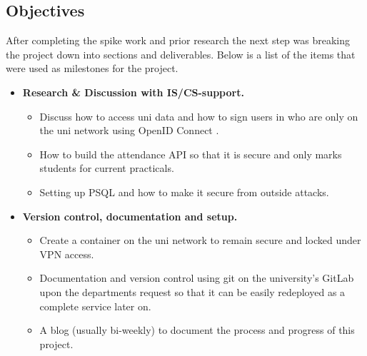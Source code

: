 \subsection{Objectives}
After completing the spike work and prior research the next step was breaking the project down into sections and deliverables. Below is a list of the items that were used as milestones for the project.

\begin{itemize}
	\item \textbf{Research \& Discussion with IS/CS-support.}
	\begin{itemize}
		\item Discuss how to access uni data and how to sign users in who are only on the uni network using OpenID Connect \cite{OpenID}.
		\item How to build the attendance API so that it is secure and only marks students for current practicals.
		\item Setting up PSQL \cite{psql} and how to make it secure from outside attacks.
	\end{itemize}
	
	\item \textbf{Version control, documentation and setup.}
	\begin{itemize}
		\item Create a container on the uni network to remain secure and locked under VPN access.
		\item Documentation and version control using git on the university's GitLab upon the departments request so that it can be easily redeployed as a complete service later on.
		\item A blog (usually bi-weekly) to document the process and progress of this project.
	\end{itemize}
	

\end{itemize}

